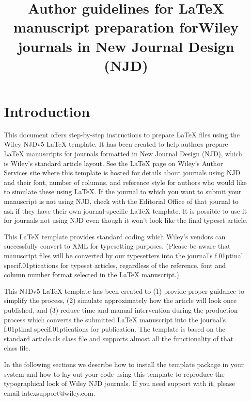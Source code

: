 \documentclass[11pt]{article}
\begin{document}
\title{\vspace*{-46pt}\bf Author guidelines for LaTeX manuscript preparation for\newline Wiley journals in New Journal Design (NJD)}

\maketitle


\section{Introduction}
\label{sec1-intro}

This document offers step-by-step instructions to prepare LaTeX f{i}les using the Wiley NJDv5 LaTeX template. It has been created to help authors prepare LaTeX manuscripts for journals formatted in New Journal Design (NJD), which is Wiley’s standard article layout. See the LaTeX page on Wiley’s Author Services site where this template is hosted for details about journals using NJD and their font, number of columns, and reference style for authors who would like to simulate these using LaTeX. If the journal to which you want to submit your manuscript is not using NJD, check with the Editorial Off{i}ce of that journal to ask if they have their own journal-specif{i}c LaTeX template. It is possible to use it for journals not using NJD even though it won’t look like the f{i}nal typeset article.

This LaTeX template provides standard coding which Wiley’s vendors can successfully convert to XML for typesetting purposes. (Please be aware that manuscript f{i}les will be converted by our typesetters into the journal’s f\kern.01ptinal specif\kern.01ptications for typeset articles, regardless of the reference, font and column number format selected in the LaTeX manuscript.)

This NJDv5 LaTeX template has been created to (1) provide proper guidance to simplify the process, (2) simulate approximately how the article will look once published, and (3) reduce time and manual intervention during the production process which converts the submitted LaTeX manuscript into the journal’s f\kern.01ptinal specif\kern.01ptications for publication. The template is based on the standard article.cls class f{i}le and supports almost all the functionality of that class f{i}le.

In the following sections we describe how to install the template package in your system and how to lay out your code using this template to reproduce the typographical look of Wiley NJD journals. If you need support with it, please email latexsupport@wiley.com.
\end{document}
